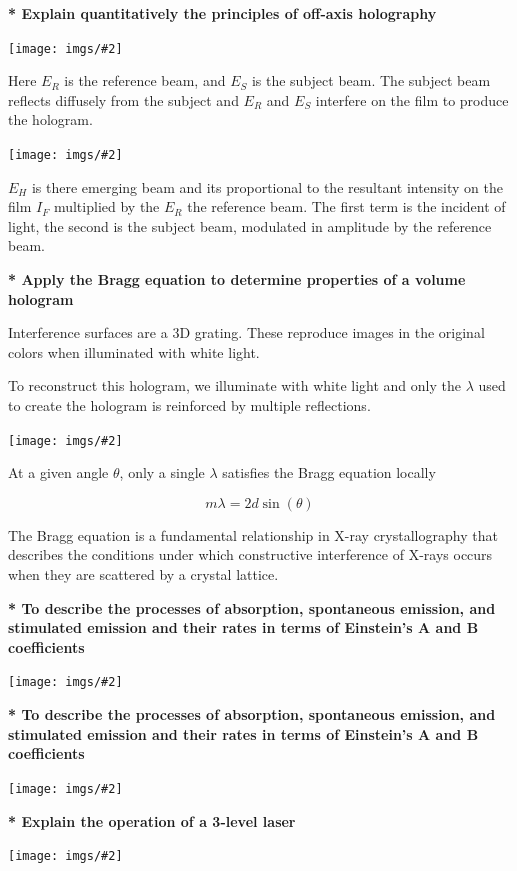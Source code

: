 \documentclass[10pt]{article}
\newcommand*{\pic}[2]{
    \begin{center}
        \texttt{[image: imgs/\#2]}
    \end{center}
}
\newcommand*{\lo}[1]{
    \textbf{* #1} \newline
}
\begin{document}
\newblock

\lo{Explain quantitatively the principles of off-axis holography}

\pic{.5}{holo.png}

Here $E_R$ is the reference beam, and $E_S$ is the subject beam. The subject beam reflects diffusely from the subject and $E_R$ and $E_S$ interfere on the film to produce the hologram.

\newblock

\pic{.5}{holo1.png}

$E_H$ is there emerging beam and its proportional to the resultant intensity on the film $I_F$ multiplied by the $E_R$ the reference beam. The first term is the incident of light, the second is the subject beam, modulated in amplitude by the reference beam.

\newpage

\lo{Apply the Bragg equation to determine properties of a volume hologram}

Interference surfaces are a 3D grating. These reproduce images in the original colors when illuminated with white light.

\newblock

To reconstruct this hologram, we illuminate with white light and only the $\lambda$ used to create the hologram is reinforced by multiple reflections.

\newblock

\pic{1}{bragg.png}

At a given angle $\theta$, only a single $\lambda$ satisfies the Bragg equation locally

\[m\lambda = 2d\sin(\theta)\]

The Bragg equation is a fundamental relationship in X-ray crystallography that describes the conditions under which constructive interference of X-rays occurs when they are scattered by a crystal lattice.

\newblock

\lo{To describe the processes of absorption, spontaneous emission, and stimulated emission and their rates in terms of Einstein's A and B coefficients}

\pic{.5}{lazy.png}

\newpage

\lo{To describe the processes of absorption, spontaneous emission, and stimulated emission and their rates in terms of Einstein's A and B coefficients}

\pic{.5}{lazy2.png}

\lo{Explain the operation of a 3-level laser}
\pic{.5}{lazy-3.png}
\end{document}
